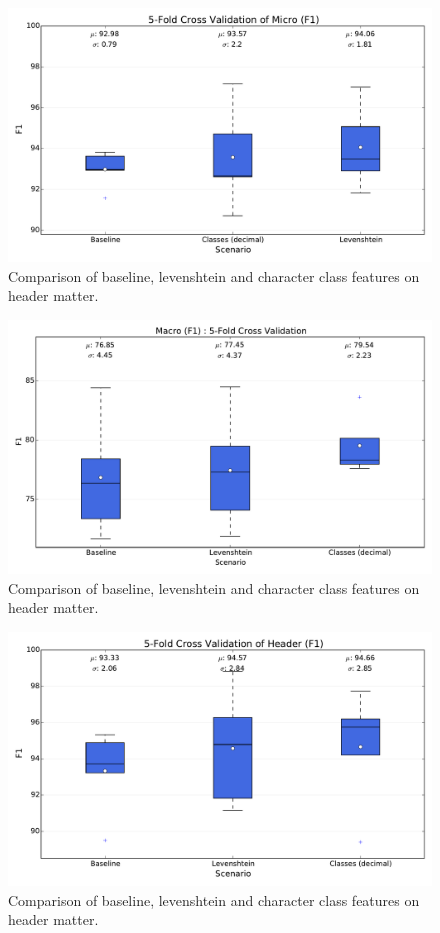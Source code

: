 \begin{figure}[h]
\center
\includegraphics[width=5.5in]{Figures/micro.pdf}
\caption{Comparison of baseline, levenshtein and character class features on header matter.}
\label{fig:micro}
\end{figure}

\begin{figure}[h]
\center
\includegraphics[width=5.5in]{Figures/macro.pdf}
\caption{Comparison of baseline, levenshtein and character class features on header matter.}
\label{fig:macro}
\end{figure}

\begin{figure}[h]
\center
\includegraphics[width=5.5in]{Figures/header.pdf}
\caption{Comparison of baseline, levenshtein and character class features on header matter.}
\label{fig:header}
\end{figure}

